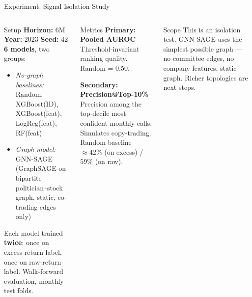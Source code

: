 \documentclass[aspectratio=169,11pt]{beamer}
\begin{document}
\begin{frame}{Experiment: Signal Isolation Study}

  \begin{columns}[T]
      \begin{block}{Setup}
        \small
        \textbf{Horizon:} 6M \quad \textbf{Year:} 2023 \quad \textbf{Seed:} 42\\[4pt]
        \textbf{6 models}, two groups:
        \begin{itemize}
          \item \textit{No-graph baselines:} Random, XGBoost(ID), XGBoost(feat),
                LogReg(feat), RF(feat)
          \item \textit{Graph model:} GNN-SAGE (GraphSAGE on bipartite
                politician--stock graph, static, co-trading edges only)
        \end{itemize}
        \medskip
        Each model trained \textbf{twice}: once on excess-return label,
        once on raw-return label. Walk-forward evaluation, monthly test folds.
      \end{block}

      \begin{block}{Metrics}
        \small
        \textbf{Primary: Pooled AUROC}\\
        Threshold-invariant ranking quality. Random = 0.50.

        \medskip
        \textbf{Secondary: Precision@Top-10\%}\\
        Precision among the top-decile most confident monthly calls.
        Simulates copy-trading.
        Random baseline $\approx 42\%$ (on excess) / $59\%$ (on raw).
      \end{block}

      \begin{alertblock}{Scope}
        \small This is an isolation test.
        GNN-SAGE uses the simplest possible graph --- no committee edges,
        no company features, static graph. Richer topologies are next steps.
      \end{alertblock}
  \end{columns}

\end{frame}
\end{document}
